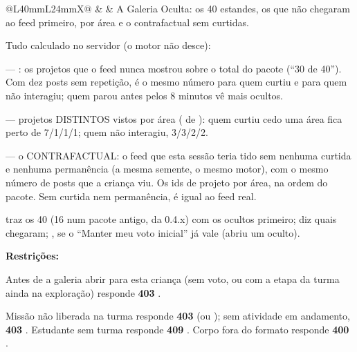 \begin{tabularx}{\linewidth}{@{}L{40mm}L{24mm}X@{}}
\zebra {} &  & A Galeria Oculta: os 40 estandes, os que não chegaram ao feed primeiro, por área e o contrafactual sem curtidas.\par Tudo calculado no servidor (o motor não desce): \par \hspace*{1em}\textbullet{}  --- : os projetos que o feed nunca mostrou sobre o total do pacote (\enquote{30 de 40}). Com dez posts sem repetição, é o mesmo número para quem curtiu e para quem não interagiu; quem parou antes pelos 8 minutos vê mais ocultos.\par \hspace*{1em}\textbullet{}  --- projetos DISTINTOS vistos por área ( de ): quem curtiu cedo uma área fica perto de 7/1/1/1; quem não interagiu, 3/3/2/2.\par \hspace*{1em}\textbullet{}  --- o CONTRAFACTUAL: o feed que esta sessão teria tido sem nenhuma curtida e nenhuma permanência (a mesma semente, o mesmo motor), com o mesmo número de posts que a criança viu. Os ids de projeto por área, na ordem do pacote. Sem curtida nem permanência, é igual ao feed real.\par {} traz os 40 (16 num pacote antigo, da 0.4.x) com os ocultos primeiro;  diz quais chegaram; , se o \enquote{Manter meu voto inicial} já vale (abriu um oculto).\par \textbf{Restrições:}\par \hspace*{1em}\textbullet{} Antes de a galeria abrir para esta criança (sem voto, ou com a etapa da turma ainda na exploração) responde \textbf{403} .\par \hspace*{1em}\textbullet{} Missão não liberada na turma responde \textbf{403}  (ou ); sem atividade em andamento, \textbf{403} . Estudante sem turma responde \textbf{409} . Corpo fora do formato responde \textbf{400} .\\

\end{tabularx}
